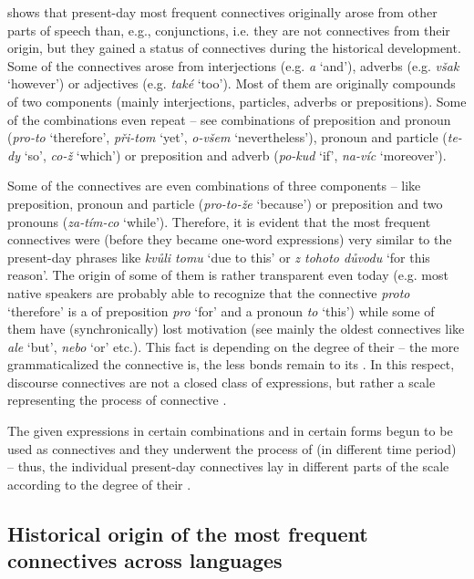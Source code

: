 \documentclass[output=paper]{langsci/langscibook.cls}
\begin{document}
 shows that  present-day most frequent connectives originally arose from other parts of speech than, e.g., conjunctions, i.e. they are not connectives from their origin, but they gained a status of connectives during the historical development. Some of the  connectives arose from interjections (e.g. \textit{a} `and'), adverbs (e.g. \textit{však} `however') or adjectives (e.g. \textit{také} `too'). Most of them are originally compounds of two components (mainly interjections, particles, adverbs or prepositions). Some of the combinations even repeat – see combinations of preposition and pronoun (\textit{pro-to} `therefore', \textit{při-tom} `yet', \textit{o-všem} `nevertheless'), pronoun and particle (\textit{te-dy} `so', \textit{co-ž} `which') or preposition and adverb (\textit{po-kud} `if', \textit{na-víc} `moreover'). 

Some of the connectives are even combinations of three components – like preposition, pronoun and particle (\textit{pro-to-že} `because') or preposition and two pronouns (\textit{za-tím-co} `while'). Therefore, it is evident that the most frequent  connectives were (before they became one-word expressions) very similar to the present-day  phrases like \textit{kvůli tomu} `due to this' or \textit{z tohoto důvodu} `for this reason'. The origin of some of them is rather transparent even today (e.g. most native speakers are probably able to recognize that the connective \textit{proto} `therefore' is a  of preposition \textit{pro} `for' and a pronoun \textit{to} `this') while some of them have (synchronically) lost motivation (see mainly the oldest connectives like \textit{ale} `but', \textit{nebo} `or' etc.). This fact is depending on the degree of their  – the more grammaticalized the connective is, the less bonds remain to its . In this respect, discourse connectives are not a closed class of expressions, but rather a scale representing the process of connective . 

\newpage
The given expressions in certain combinations and in certain forms begun to be used as connectives and they underwent the process of  (in different time period) – thus, the individual present-day connectives lay in different parts of the scale according to the degree of their .

\subsection{Historical origin of the most frequent connectives across languages}
\end{document}
